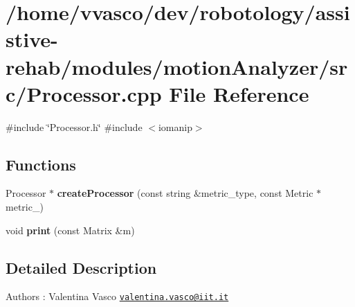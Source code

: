 \section{/home/vvasco/dev/robotology/assistive-\/rehab/modules/motion\+Analyzer/src/\+Processor.cpp File Reference}
\label{Processor_8cpp}
{\ttfamily \#include \char`\"{}Processor.\+h\char`\"{}}\newline
{\ttfamily \#include $<$iomanip$>$}\newline
\subsection*{Functions}
\begin{DoxyCompactItemize}
\item 
\mbox{\label{Processor_8cpp_a9f00bd3632d3c6070e667213c2d75aa6}} 
Processor $\ast$ {\bfseries create\+Processor} (const string \&metric\+\_\+type, const Metric $\ast$metric\+\_\+)
\item 
\mbox{\label{Processor_8cpp_a9ed8164d10bb492e02ff6bad278676ee}} 
void {\bfseries print} (const Matrix \&m)
\end{DoxyCompactItemize}


\subsection{Detailed Description}
\begin{DoxyAuthor}{Authors}
\+: Valentina Vasco \href{mailto:valentina.vasco@iit.it}{\tt valentina.\+vasco@iit.\+it} 
\end{DoxyAuthor}
